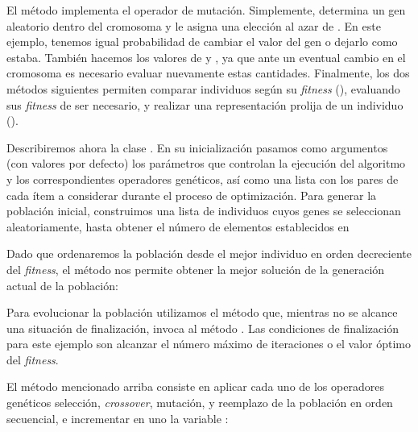 
El método  implementa el operador de mutación. Simplemente, determina un gen aleatorio dentro del cromosoma y le asigna una elección al azar de . En este ejemplo, tenemos igual probabilidad de cambiar el valor del gen o dejarlo como estaba. También hacemos  los valores de  y , ya que ante un eventual cambio en el cromosoma es necesario evaluar nuevamente estas cantidades. Finalmente, los dos métodos siguientes permiten comparar individuos según su \textit{fitness} (), evaluando sus \textit{fitness} de ser necesario, y realizar una representación prolija de un individuo ().

Describiremos ahora la clase . En su inicialización pasamos como argumentos (con valores por defecto) los parámetros que controlan la ejecución del algoritmo y los correspondientes operadores genéticos, así como una lista con los pares  de cada ítem a considerar durante el proceso de optimización. Para generar la población inicial, construimos una lista de individuos cuyos genes se seleccionan aleatoriamente, hasta obtener el número de elementos establecidos en 



Dado que ordenaremos la población desde el mejor individuo en orden decreciente del \textit{fitness}, el método  nos permite obtener la mejor solución de la generación actual de la población:


Para evolucionar la población utilizamos el método  que, mientras no se alcance una situación de finalización, invoca al método . Las condiciones de finalización para este ejemplo son alcanzar el número máximo de iteraciones o el valor óptimo del \textit{fitness}.


El método  mencionado arriba consiste en aplicar cada uno de los operadores genéticos selección, \textit{crossover}, mutación, y reemplazo de la población en orden secuencial, e incrementar en uno la variable :


